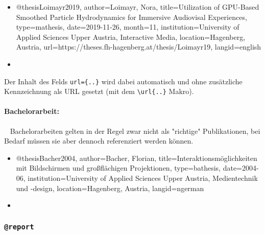 %
\begin{itemize}
\item[]
\begin{GenericCode}[numbers=none]
@thesis{Loimayr2019,
  author={Loimayr, Nora},
  title={Utilization of GPU-Based Smoothed Particle Hydrodynamics for Immersive Audiovisal Experiences},
  type={mathesis},
  date={2019-11-26},
  month={11},
  institution={University of Applied Sciences Upper Austria, Interactive Media},
  location={Hagenberg, Austria},
  url={https://theses.fh-hagenberg.at/thesis/Loimayr19},
  langid={english}
}
\end{GenericCode}
\item[\cite{Loimayr2019}] 
\end{itemize}
%
Der Inhalt des Felds \verb!url={..}! wird dabei automatisch und ohne
zusätzliche Kennzeichnung als URL gesetzt (mit dem \verb!\url{..}! Makro).


\paragraph{Bachelorarbeit:} ~ \newline
Bachelorarbeiten gelten in der Regel zwar nicht als "richtige" Publikationen,
bei Bedarf müssen sie aber dennoch referenziert werden können.
%
\begin{itemize}
\item[]
\begin{GenericCode}[numbers=none]
@thesis{Bacher2004,
  author={Bacher, Florian},
  title={Interaktionsmöglichkeiten mit Bildschirmen und großflächigen Projektionen},
  type={bathesis},
  date={2004-06},
  institution={University of Applied Sciences Upper Austria, Medientechnik und {-design}},
  location={Hagenberg, Austria},
  langid={ngerman}
}
\end{GenericCode}
\item[\cite{Bacher2004}] 
\end{itemize}


\subsubsection{\texttt{\bfseries @report}}
\label{sec:@report}

